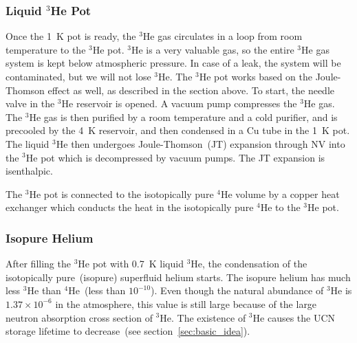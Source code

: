    

\subsubsection{Liquid $^3$He Pot\label{sec:He3pot}}

Once the 1~K pot is ready, the $^3$He gas circulates in a loop from
room temperature to the $^3$He pot. $^3$He is a very valuable gas, so
the entire $^3$He gas system is kept below atmospheric pressure. In
case of a leak, the system will be contaminated, but we will not lose
$^3$He. The $^3$He pot works based on the Joule-Thomson effect as
well, as described in the section above.  To start, the needle valve
in the $^3$He reservoir is opened. A vacuum pump compresses the $^3$He
gas. The $^3$He gas is then purified by a room temperature and a cold
purifier, and is precooled by the 4~K reservoir, and then condensed in
a Cu tube in the 1~K pot. The liquid $^3$He then undergoes
Joule-Thomson~(JT) expansion through NV into the $^3$He pot which is
decompressed by vacuum pumps. The JT expansion is isenthalpic.


The $^3$He pot is connected to the isotopically pure $^4$He volume by
a copper heat exchanger which conducts the heat in the
isotopically pure $^4$He to the $^3$He pot.



\subsubsection{Isopure Helium}
After filling the $^3$He pot with 0.7~K liquid $^3$He, the
condensation of the isotopically pure~(isopure) superfluid helium
starts. The isopure helium has much less $^3$He than $^4$He~(less than
$10^{-10}$).  Even though the natural abundance of $^3$He is
$1.37 \times 10^{-6}$ in the atmosphere, this value is still large
because of the large neutron absorption cross section of $^3$He. The
existence of $^3$He causes the UCN storage lifetime to decrease~(see
section~\ref{sec:basic_idea}).

